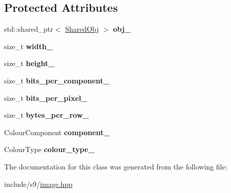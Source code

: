\subsection*{Protected Attributes}
\begin{DoxyCompactItemize}
\item 
\hypertarget{classs9_1_1Image_ad7fd39badfa7de65327282ee8967a1f4}{std\-::shared\-\_\-ptr$<$ \hyperlink{structs9_1_1Image_1_1SharedObj}{Shared\-Obj} $>$ {\bfseries obj\-\_\-}}\label{classs9_1_1Image_ad7fd39badfa7de65327282ee8967a1f4}

\item 
\hypertarget{classs9_1_1Image_a3daf79df2c18728af8c20027d1f975ea}{size\-\_\-t {\bfseries width\-\_\-}}\label{classs9_1_1Image_a3daf79df2c18728af8c20027d1f975ea}

\item 
\hypertarget{classs9_1_1Image_aeccf42f901665ac318f94724e8d957cb}{size\-\_\-t {\bfseries height\-\_\-}}\label{classs9_1_1Image_aeccf42f901665ac318f94724e8d957cb}

\item 
\hypertarget{classs9_1_1Image_ac520093e8730e13c29566bbdf6053da4}{size\-\_\-t {\bfseries bits\-\_\-per\-\_\-component\-\_\-}}\label{classs9_1_1Image_ac520093e8730e13c29566bbdf6053da4}

\item 
\hypertarget{classs9_1_1Image_a63b8344df6cf2a31480f3e2efa0a36f7}{size\-\_\-t {\bfseries bits\-\_\-per\-\_\-pixel\-\_\-}}\label{classs9_1_1Image_a63b8344df6cf2a31480f3e2efa0a36f7}

\item 
\hypertarget{classs9_1_1Image_a72fbed37956796f45b7a5f3983f14c33}{size\-\_\-t {\bfseries bytes\-\_\-per\-\_\-row\-\_\-}}\label{classs9_1_1Image_a72fbed37956796f45b7a5f3983f14c33}

\item 
\hypertarget{classs9_1_1Image_abb58fd4298e606f2e0e8a769fda3a627}{Colour\-Component {\bfseries component\-\_\-}}\label{classs9_1_1Image_abb58fd4298e606f2e0e8a769fda3a627}

\item 
\hypertarget{classs9_1_1Image_a38a9158ee0dbabaee5b30429b35c9685}{Colour\-Type {\bfseries colour\-\_\-type\-\_\-}}\label{classs9_1_1Image_a38a9158ee0dbabaee5b30429b35c9685}

\end{DoxyCompactItemize}


The documentation for this class was generated from the following file\-:\begin{DoxyCompactItemize}
\item 
include/s9/\hyperlink{image_8hpp}{image.\-hpp}\end{DoxyCompactItemize}
